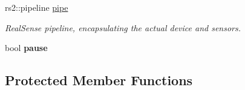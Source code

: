 \begin{DoxyCompactItemize}
rs2\+::pipeline \hyperlink{classsofa_1_1rgbdtracking_1_1_real_sense_cam_a630e600956571e553972403bba7fcf02}{pipe}
\begin{DoxyCompactList}\small\item\em Real\+Sense pipeline, encapsulating the actual device and sensors. \end{DoxyCompactList}\item 
\mbox{\label{classsofa_1_1rgbdtracking_1_1_real_sense_cam_a9fce91c3e7d2c1be3aaca521ea28d14f}} 
bool {\bfseries pause}
\end{DoxyCompactItemize}
\subsection*{Protected Member Functions}

